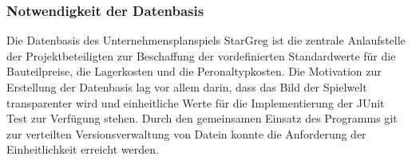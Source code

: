 \subsubsection{Notwendigkeit der Datenbasis}
\label{subsub:spielwelt-datenbasis-einleitung-notwendigkeit}

Die Datenbasis des Unternehmensplanspiels StarGreg ist die zentrale Anlaufstelle der Projektbeteiligten zur Beschaffung der vordefinierten Standardwerte für die Bauteilpreise, die Lagerkosten und die Peronaltypkosten. Die Motivation zur Erstellung der Datenbasis lag vor allem darin, dass das Bild der Spielwelt transparenter wird und einheitliche Werte für die Implementierung der JUnit Test zur Verfügung stehen. Durch den gemeinsamen Einsatz des Programms git zur verteilten Versionsverwaltung von Datein konnte die Anforderung der Einheitlichkeit erreicht werden. 
